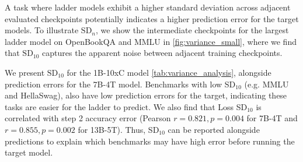 A task where ladder models exhibit a higher standard deviation across adjacent evaluated checkpoints potentially indicates a higher prediction error for the target models. To illustrate $\text{SD}_n$, we show the intermediate checkpoints for the largest ladder model on OpenBookQA and MMLU in \autoref{fig:variance_small}, where we find that $\text{SD}_{10}$ captures the apparent noise between adjacent training checkpoints. 




We present $\text{SD}_{10}$ for the 1B-10xC model \autoref{tab:variance_analysis}, alongside prediction errors for the 7B-4T model.
Benchmarks with low SD$_{10}$ (e.g. MMLU and HellaSwag), also have low prediction errors for the target, indicating these tasks are easier for the ladder to predict.
We also find that Loss SD$_{10}$ is correlated with step 2 accuracy error (Pearson $r=0.821, p=0.004$ for 7B-4T and $r=0.855, p=0.002$ for 13B-5T).
Thus, SD$_{10}$ can be reported alongside predictions to explain which benchmarks may have high error before running the target model.

% 







